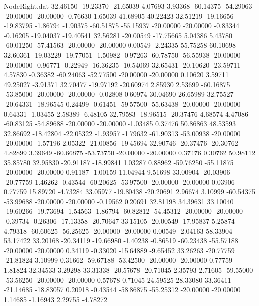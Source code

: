 \begin{filecontents}{NodeRight.dat}
  32.46150  -19.23370  -21.65039     4.07693    3.93368  -60.14375  -54.29063  -20.00000  -20.00000   -0.76630    1.65039   41.68905   40.22423
  32.51219  -19.16656  -19.83795    -1.86794   -1.90375  -60.51875  -55.15937  -20.00000  -20.00000   -0.83344   -0.16205  -19.04037  -19.40541
  32.56281  -20.00549  -17.75665     5.04386    5.43780  -60.01250  -57.41563  -20.00000  -20.00000    0.00549   -2.24335   55.75258   60.10698
  32.60361  -19.03229  -19.77051    -1.50982   -0.97263  -60.78750  -56.55938  -20.00000  -20.00000   -0.96771   -0.22949  -16.36235  -10.54069
  32.65431  -20.10620  -23.59711     4.57830   -0.36382  -60.24063  -52.77500  -20.00000  -20.00000    0.10620    3.59711   49.25027   -3.91371
  32.70477  -19.97192  -20.60974     2.85930    2.53699  -60.16875  -53.85000  -20.00000  -20.00000   -0.02808    0.60974   30.04690   26.65989
  32.75527  -20.64331  -18.96545     0.24499   -0.61451  -59.57500  -55.63438  -20.00000  -20.00000    0.64331   -1.03455    2.58389   -6.48105
  32.79583  -18.96515  -20.37476     4.68574    4.47086  -60.83125  -54.89688  -20.00000  -20.00000   -1.03485    0.37476   50.86863   48.53593
  32.86692  -18.42804  -22.05322    -1.93957   -1.79632  -61.90313  -53.00938  -20.00000  -20.00000   -1.57196    2.05322  -21.00856  -19.45694
  32.90746  -20.37476  -20.30762     4.82899    3.39649  -60.66875  -53.73750  -20.00000  -20.00000    0.37476    0.30762   50.98112   35.85780
  32.95830  -20.91187  -18.99841     1.03287    0.88962  -59.76250  -55.11875  -20.00000  -20.00000    0.91187   -1.00159   11.04944    9.51698
  33.00904  -20.03906  -20.77759     1.46262   -0.43544  -60.20625  -53.97500  -20.00000  -20.00000    0.03906    0.77759   15.89720   -4.73284
  33.05977  -19.80438  -20.20691     2.96674    3.10999  -60.54375  -53.99688  -20.00000  -20.00000   -0.19562    0.20691   32.81198   34.39631
  33.10040  -19.60266  -19.73694    -1.54563   -1.86794  -60.82812  -54.45312  -20.00000  -20.00000   -0.39734   -0.26306  -17.13358  -20.70647
  33.15105  -20.00549  -17.95837     5.25874    4.79318  -60.60625  -56.25625  -20.00000  -20.00000    0.00549   -2.04163   58.33904   53.17422
  33.20168  -20.34119  -19.66980    -1.40238   -0.86519  -60.23438  -55.57188  -20.00000  -20.00000    0.34119   -0.33020  -15.64889   -9.65452
  33.26263  -20.77759  -21.81824     3.10999    0.31662  -59.67188  -53.42500  -20.00000  -20.00000    0.77759    1.81824   32.34533    3.29298
  33.31338  -20.57678  -20.71045     2.35793    2.71605  -59.55000  -53.56250  -20.00000  -20.00000    0.57678    0.71045   24.59525   28.33080
  33.36411  -21.14685  -18.83057     0.20918   -0.43544  -58.86875  -55.25312  -20.00000  -20.00000    1.14685   -1.16943    2.29755   -4.78272

\end{filecontents}
